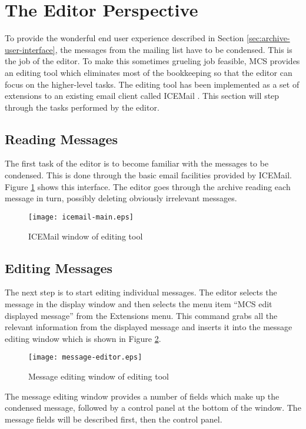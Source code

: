 \section{The Editor Perspective}
To provide the wonderful end user experience described in Section
\ref{sec:archive-user-interface}, the messages from the mailing list have to be
condensed. This is the job of the editor. To make this sometimes grueling job
feasible, MCS provides an editing tool which eliminates most of the bookkeeping
so that the editor can focus on the higher-level tasks. The editing tool has
been implemented as a set of extensions to an existing email client called
ICEMail \cite{icemail-website}. This section will step through the tasks
performed by the editor.

\subsection{Reading Messages}
The first task of the editor is to become familiar with the messages to be
condensed. This is done through the basic email facilities provided by ICEMail.
Figure \ref{fig:icemail-main} shows this interface. The editor goes through the
archive reading each message in turn, possibly deleting obviously irrelevant
messages.

\begin{figure}[htb]
  \centering \texttt{[image: icemail-main.eps]}
  \caption{ICEMail window of editing tool}
  \label{fig:icemail-main}
\end{figure}

\subsection{Editing Messages}
\label{sec:editing-messages}
The next step is to start editing individual messages. The editor selects the
message in the display window and then selects the menu item ``MCS edit
displayed message'' from the Extensions menu. This command grabs all the
relevant information from the displayed message and inserts it into the message
editing window which is shown in Figure \ref{fig:message-editor}.

\begin{figure}[htbp]
  \centering
  \texttt{[image: message-editor.eps]}
  \caption{Message editing window of editing tool}
  \label{fig:message-editor}
\end{figure}

The message editing window provides a number of fields which make up the
condensed message, followed by a control panel at the bottom of the
window. The message fields will be described first, then the control panel.

